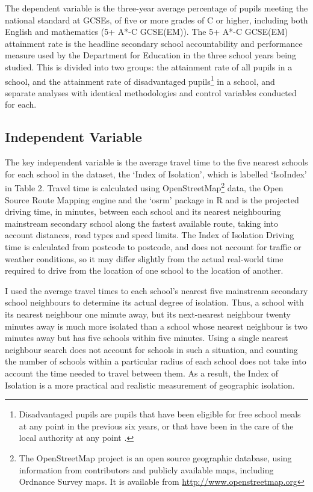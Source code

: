 \documentclass[12pt, a4paper]{article}
\begin{document}
The dependent variable is the three-year average percentage of pupils meeting the national standard at GCSEs, of five or more grades of C or higher, including both English and mathematics (5+ A*-C GCSE(EM)). The 5+ A*-C GCSE(EM) attainment rate is the headline secondary school accountability and performance measure used by the Department for Education in the three school years being studied. This is divided into two groups: the attainment rate of all pupils in a school, and the attainment rate of disadvantaged pupils\footnote{Disadvantaged pupils are pupils that have been eligible for free school meals at any point in the previous six years, or that have been in the care of the local authority at any point \autocite{departmentforeducation2016c}.} in a school, and separate analyses with identical methodologies and control variables conducted for each.

\subsection{Independent Variable}

The key independent variable is the average travel time to the five nearest schools for each school in the dataset, the `Index of Isolation', which is labelled `IsoIndex' in Table 2. Travel time is calculated using OpenStreetMap\footnote{The OpenStreetMap project is an open source geographic database, using information from contributors and publicly available maps, including Ordnance Survey maps. It is available from \url{http://www.openstreetmap.org}} data, the Open Source Route Mapping engine \autocites{luxen2011} and the `osrm' package in R \autocites{giraud2016} and is the projected driving time, in minutes, between each school and its nearest neighbouring mainstream secondary school along the fastest available route, taking into account distances, road types and speed limits. The Index of Isolation Driving time is calculated from postcode to postcode, and does not account for traffic or weather conditions, so it may differ slightly from the actual real-world time required to drive from the location of one school to the location of another.

I used the average travel times to each school's nearest five mainstream secondary school neighbours to determine its actual degree of isolation. Thus, a school with its nearest neighbour one minute away, but its next-nearest neighbour twenty minutes away is much more isolated than a school whose nearest neighbour is two minutes away but has five schools within five minutes. Using a single nearest neighbour search does not account for schools in such a situation, and counting the number of schools within a particular radius of each school does not take into account the time needed to travel between them. As a result, the Index of Isolation is a more practical and realistic measurement of geographic isolation.
\end{document}

